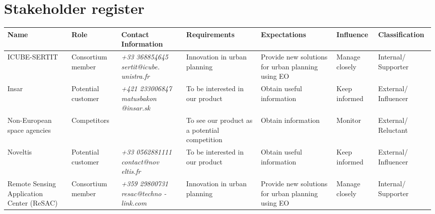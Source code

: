 \section{Stakeholder register}

\begin{center}
	\begin{longtable}{>{\raggedright\arraybackslash}p{2.2cm} >{\raggedright\arraybackslash}p{1.5cm} >{\raggedright\arraybackslash}p{2cm} | >{\raggedright\arraybackslash}p{2.2cm} >{\raggedright\arraybackslash}p{2cm} >{\raggedright\arraybackslash}p{1.4cm} >{\raggedright\arraybackslash}p{2.1cm}}
		
		\toprule[2pt]
		
		\textbf{Name} & \textbf{Role} & \textbf{Contact Information} & \textbf{Requirements} & \textbf{Expectations} & \textbf{Influence} & \textbf{Classification} \\ 
		
		\midrule[1.5pt] \endhead
		
		ICUBE-SERTIT & Consortium member & \textit{+33 368854645 \newline \newline sertit@icube. unistra.fr} & Innovation in urban planning & Provide new solutions for urban planning using EO & Manage closely & Internal/ Supporter \\ \hline
		
		Insar & Potential customer & \textit{+421 233006847 \newline \newline matusbakon @insar.sk} & To be interested in our product & Obtain useful information & Keep informed & External/ Influencer \\ \hline
		
		Non-European space agencies & Competitors & \textit{} & To see our product as a potential competition & Obtain information & Monitor & External/ Reluctant \\ \hline
		
		Noveltis & Potential customer & \textit{+33 0562881111 \newline \newline contact@nov eltis.fr} & To be interested in our product & Obtain useful information & Keep informed & External/ Influencer \\ \hline
		
		Remote Sensing Application Center (ReSAC) & Consortium member & \textit{+359 29800731 \newline \newline resac@techno -link.com} & Innovation in urban planning & Provide new solutions for urban planning using EO & Manage closely & Internal/ Supporter \\ \hline
		

\end{longtable}
\end{center}
